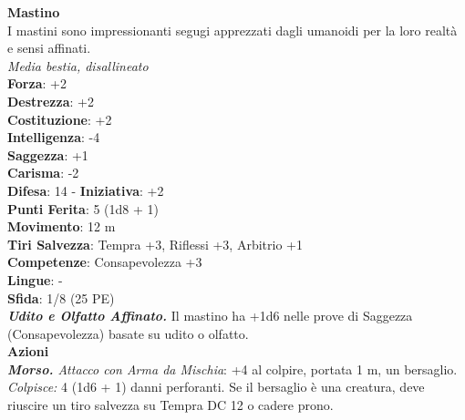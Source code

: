 \begin{multicols}{2}
\medskip\textbf{Mastino}\\
I mastini sono impressionanti segugi apprezzati dagli umanoidi per la loro realtà e sensi affinati.\\
\emph{Media bestia, disallineato}\\
\textbf{Forza}: +2\\
\textbf{Destrezza}: +2\\
\textbf{Costituzione}: +2\\
\textbf{Intelligenza}: -4\\
\textbf{Saggezza}: +1\\
\textbf{Carisma}: -2\\
\textbf{Difesa}: 14 - \textbf{Iniziativa}: +2\\
\textbf{Punti Ferita}: 5 (1d8 + 1)\\
\textbf{Movimento}: 12 m\\
\textbf{Tiri Salvezza}: Tempra +3, Riflessi +3, Arbitrio +1 \\
\textbf{Competenze}: Consapevolezza +3\\
\textbf{Lingue}: -\\
\textbf{Sfida}: 1/8 (25 PE)\smallskip\\
\emph{\textbf{Udito e Olfatto Affinato.}} Il mastino ha +1d6 nelle prove di Saggezza (Consapevolezza) basate su udito o olfatto.\\
\smallskip\textbf{Azioni}\\
\emph{\textbf{Morso.} Attacco con Arma da Mischia}: +4 al colpire, portata 1 m, un bersaglio.\\
\emph{Colpisce:} 4 (1d6 + 1) danni perforanti. Se il bersaglio è una creatura, deve riuscire un tiro salvezza su Tempra DC  12 o cadere prono.\\


\end{multicols}
